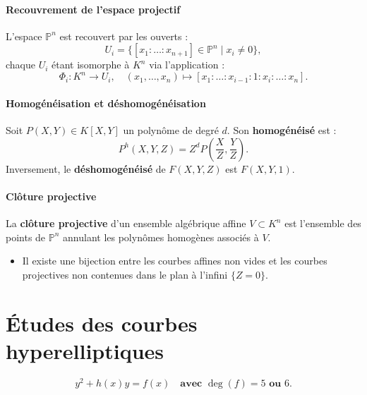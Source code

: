 \documentclass[12pt,a4paper]{article}
\begin{document}
	\paragraph{Recouvrement de l’espace projectif}
	L’espace $\mathbb{P}^n$ est recouvert par les ouverts :
	\[
	U_i = \{[x_1 : \dots : x_{n+1}] \in \mathbb{P}^n \mid x_i \neq 0\},
	\]
	chaque $U_i$ étant isomorphe à $K^n$ via l’application :
	\[
	\Phi_i : K^n \to U_i, \quad (x_1, \dots, x_n) \mapsto [x_1 : \dots : x_{i-1} : 1 : x_i : \dots : x_n].
	\]
	
	\paragraph{Homogénéisation et déshomogénéisation}
	Soit $P(X, Y) \in K[X, Y]$ un polynôme de degré $d$. Son \textbf{homogénéisé} est :
	\[
	P^h(X, Y, Z) = Z^d P\left(\frac{X}{Z}, \frac{Y}{Z}\right).
	\]
	Inversement, le \textbf{déshomogénéisé} de $F(X, Y, Z)$ est $F(X, Y, 1)$.
	
	\paragraph{Clôture projective}
	La \textbf{clôture projective} d’un ensemble algébrique affine $V \subset K^n$ est l’ensemble des points de $\mathbb{P}^n$ annulant les polynômes homogènes associés à $V$.
	
	\begin{itemize}
		\item Il existe une bijection entre les courbes affines non vides et les courbes projectives non contenues dans le plan à l’infini $\{Z = 0\}$.
	\end{itemize}
	\newpage
	\section{Études des courbes hyperelliptiques}
	\[
	y^2 + h(x)y = f(x) \quad \textbf{avec } \deg(f)=5 \textbf{ ou } 6.
	\]
	
\end{document}
